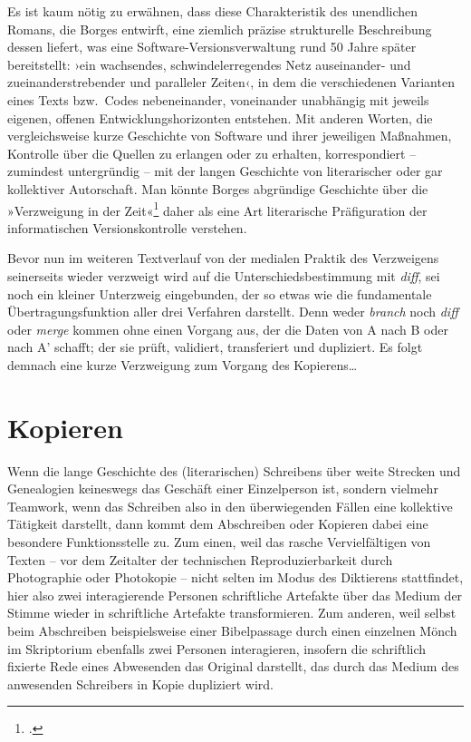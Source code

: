 \documentclass[a4paper,10pt]{article}
\newcommand{\anf}[1]{»#1«}
\newcommand{\inanf}[1]{›#1‹}
\begin{document}
Es ist kaum nötig zu erwähnen, dass diese Charakteristik des unendlichen Romans, die Borges entwirft, eine ziemlich präzise strukturelle Beschreibung dessen liefert, was eine Software-Versionsverwaltung rund 50 Jahre später bereitstellt: \inanf{ein wachsendes, schwindelerregendes Netz auseinander- und zueinanderstrebender und paralleler Zeiten}, in dem die verschiedenen Varianten eines Texts bzw.\  Codes nebeneinander, voneinander unabhängig mit jeweils eigenen, offenen Entwicklungshorizonten entstehen. Mit anderen Worten, die vergleichsweise kurze Geschichte von Software und ihrer jeweiligen Maßnahmen, Kontrolle über die Quellen zu erlangen oder zu erhalten, korrespondiert – zumindest untergründig – mit der langen Geschichte von literarischer oder gar kollektiver Autorschaft. Man könnte Borges abgründige Geschichte über die \anf{Verzweigung in der Zeit}\footcite[169]{borges:1941} daher als eine Art literarische Präfiguration der informatischen Versionskontrolle verstehen. 

Bevor nun im weiteren Textverlauf von der medialen Praktik des Verzweigens seinerseits wieder verzweigt wird auf die Unterschiedsbestimmung mit \emph{diff}, sei noch ein kleiner Unterzweig eingebunden, der so etwas wie die fundamentale Übertragungsfunktion aller drei Verfahren darstellt. Denn weder \emph{branch} noch \emph{diff} oder \emph{merge} kommen ohne einen Vorgang aus, der die Daten von A nach B oder nach A' schafft; der sie prüft, validiert, transferiert und dupliziert. Es folgt demnach eine kurze Verzweigung zum Vorgang des Kopierens\ldots


\section{Kopieren}

Wenn die lange Geschichte des (literarischen) Schreibens über weite Strecken und Genealogien keineswegs das Geschäft einer Einzelperson ist, sondern vielmehr Teamwork, wenn das Schreiben also in den überwiegenden Fällen eine kollektive Tätigkeit darstellt, dann kommt dem Abschreiben oder Kopieren dabei eine besondere Funktionsstelle zu. Zum einen, weil das rasche Vervielfältigen von Texten – vor dem Zeitalter der technischen Reproduzierbarkeit durch Photographie oder Photokopie – nicht selten im Modus des Diktierens stattfindet, hier also zwei interagierende Personen schriftliche Artefakte über das Medium der Stimme wieder in schriftliche Artefakte transformieren. Zum anderen, weil selbst beim Abschreiben beispielsweise einer Bibelpassage durch einen einzelnen Mönch im Skriptorium ebenfalls zwei Personen interagieren, insofern die schriftlich fixierte Rede eines Abwesenden das Original darstellt, das durch das Medium des anwesenden Schreibers in Kopie dupliziert wird. 
\end{document}
